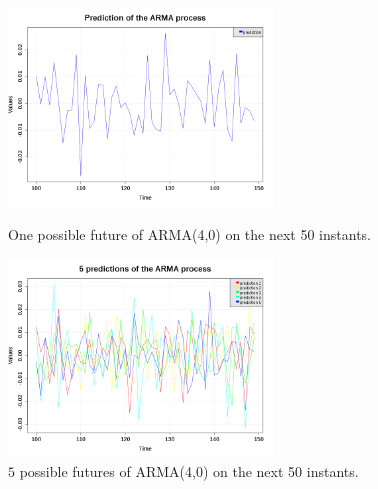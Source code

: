 \begin{figure}[H]
  \begin{minipage}{9cm}
    \begin{center}
      \includegraphics[width=7cm]{Figures/arma1D_prediction.png}
      \caption{One possible future of ARMA(4,0) on the next 50 instants.}
      \label{arma_Prediction}
    \end{center}
  \end{minipage}
  \hfill
  \begin{minipage}{9cm}
    \begin{center}
      \includegraphics[width=7cm]{Figures/arma1D_predictions.png}
      \caption{$5$ possible futures of ARMA(4,0) on the next 50 instants.}
      \label{arma_Predictions}
    \end{center}
  \end{minipage}
\end{figure}
